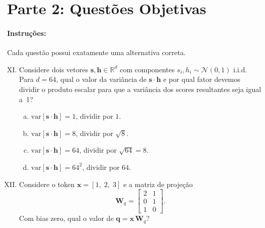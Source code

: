 \documentclass{dlproblemset}
\begin{document}
\section*{Parte 2: Questões Objetivas}

\paragraph{Instruções:} Cada questão possui exatamente uma alternativa correta.

\begin{enumerate}[I)]
\setcounter{enumi}{10}

\item Considere dois vetores $\mathbf{s}, \mathbf{h} \in \mathbb{R}^d$ com componentes
      $s_i, h_i \sim \mathcal{N}(0, 1)$ i.i.d. Para $d = 64$, qual o valor da
      variância de $\mathbf{s} \cdot \mathbf{h}$ e por qual fator devemos dividir o produto
      escalar para que a variância dos scores resultantes seja igual a~1?

\begin{enumerate}[a)]
    \item $\mathrm{var}[\mathbf{s} \cdot \mathbf{h}] = 1$, dividir por $1$.
    \item $\mathrm{var}[\mathbf{s} \cdot \mathbf{h}] = 8$, dividir por $\sqrt{8}$.
    \item $\mathrm{var}[\mathbf{s} \cdot \mathbf{h}] = 64$, dividir por $\sqrt{64} = 8$.
    \item $\mathrm{var}[\mathbf{s} \cdot \mathbf{h}] = 64^2$, dividir por $64$.
\end{enumerate}

\item Considere o token $\mathbf{x} = [1,\;2,\;3]$ e a matriz de projeção
      \[
        \mathbf{W}_q = \begin{bmatrix} 2 & 1 \\ 0 & 1 \\ 1 & 0 \end{bmatrix}.
      \]
      Com bias zero, qual o valor de $\mathbf{q} = \mathbf{x} \, \mathbf{W}_q$?


\end{enumerate}
\end{document}
